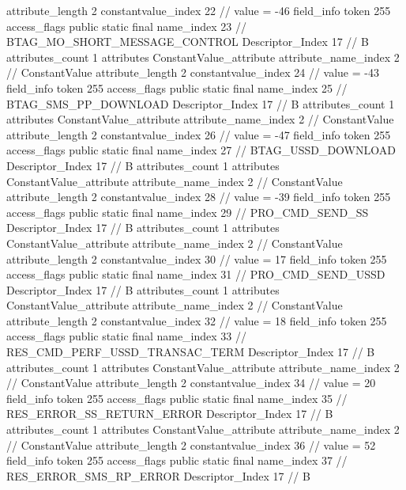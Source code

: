 {{{{{{{					attribute_length	2
					constantvalue_index	22		// value = -46
				}
				}
			}
			field_info {
				token	255
				access_flags	public static final
				name_index	23		// BTAG_MO_SHORT_MESSAGE_CONTROL
				Descriptor_Index	17		// B
				attributes_count	1
				attributes {
				ConstantValue_attribute {
					attribute_name_index	2		// ConstantValue
					attribute_length	2
					constantvalue_index	24		// value = -43
				}
				}
			}
			field_info {
				token	255
				access_flags	public static final
				name_index	25		// BTAG_SMS_PP_DOWNLOAD
				Descriptor_Index	17		// B
				attributes_count	1
				attributes {
				ConstantValue_attribute {
					attribute_name_index	2		// ConstantValue
					attribute_length	2
					constantvalue_index	26		// value = -47
				}
				}
			}
			field_info {
				token	255
				access_flags	public static final
				name_index	27		// BTAG_USSD_DOWNLOAD
				Descriptor_Index	17		// B
				attributes_count	1
				attributes {
				ConstantValue_attribute {
					attribute_name_index	2		// ConstantValue
					attribute_length	2
					constantvalue_index	28		// value = -39
				}
				}
			}
			field_info {
				token	255
				access_flags	public static final
				name_index	29		// PRO_CMD_SEND_SS
				Descriptor_Index	17		// B
				attributes_count	1
				attributes {
				ConstantValue_attribute {
					attribute_name_index	2		// ConstantValue
					attribute_length	2
					constantvalue_index	30		// value = 17
				}
				}
			}
			field_info {
				token	255
				access_flags	public static final
				name_index	31		// PRO_CMD_SEND_USSD
				Descriptor_Index	17		// B
				attributes_count	1
				attributes {
				ConstantValue_attribute {
					attribute_name_index	2		// ConstantValue
					attribute_length	2
					constantvalue_index	32		// value = 18
				}
				}
			}
			field_info {
				token	255
				access_flags	public static final
				name_index	33		// RES_CMD_PERF_USSD_TRANSAC_TERM
				Descriptor_Index	17		// B
				attributes_count	1
				attributes {
				ConstantValue_attribute {
					attribute_name_index	2		// ConstantValue
					attribute_length	2
					constantvalue_index	34		// value = 20
				}
				}
			}
			field_info {
				token	255
				access_flags	public static final
				name_index	35		// RES_ERROR_SS_RETURN_ERROR
				Descriptor_Index	17		// B
				attributes_count	1
				attributes {
				ConstantValue_attribute {
					attribute_name_index	2		// ConstantValue
					attribute_length	2
					constantvalue_index	36		// value = 52
				}
				}
			}
			field_info {
				token	255
				access_flags	public static final
				name_index	37		// RES_ERROR_SMS_RP_ERROR
				Descriptor_Index	17		// B
}}}}}
